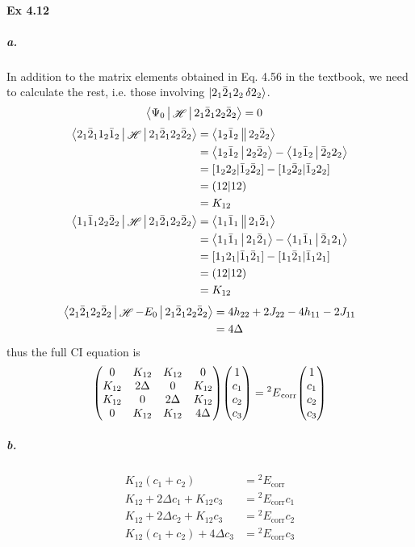 \documentclass[a4paper]{article}
\DeclareMathOperator{\sH}{\mathscr{H}}
\DeclareMathOperator{\corr}{\mathrm{corr}}
\newcommand{\ex}[1]{\paragraph{Ex #1}}
\newcommand{\subex}[1]{\subparagraph{#1}}
\numberwithin{equation}{subsection}
\begin{document}
\ex{4.12}
\subex{a.}
In addition to the matrix elements obtained in Eq. 4.56 in the textbook, we need to calculate the rest, i.e. those involving $ \ket{2_1\bar{2}_1 2_2\var{2}_2} $.
\begin{align}
\Braket{\Psi_0 | \sH | 2_1\bar{2}_1 2_2\bar{2}_2} &= 0 
\end{align}
\begin{align}
\Braket{2_1 \bar{2}_1 1_2\bar{1}_2 | \sH | 2_1\bar{2}_1 2_2\bar{2}_2} &= \Braket{1_2\bar{1}_2 || 2_2\bar{2}_2} \notag\\
&= \Braket{1_2\bar{1}_2 | 2_2\bar{2}_2} - \Braket{1_2\bar{1}_2 | \bar{2}_2 2_2} \notag\\
&= [1_2 2_2|\bar{1}_2 \bar{2}_2] - [1_2 \bar{2}_2 |\bar{1}_2 2_2] \notag\\
&= (12|12) \notag\\
&= K_{12} \\
\Braket{1_1 \bar{1}_1 2_2\bar{2}_2 | \sH | 2_1\bar{2}_1 2_2\bar{2}_2} &= \Braket{1_1 \bar{1}_1 || 2_1\bar{2}_1} \notag\\
&= \Braket{1_1 \bar{1}_1 | 2_1\bar{2}_1} - \Braket{1_1 \bar{1}_1 |\bar{2}_1 2_1} \notag\\
&= [1_1 2_1|\bar{1}_1 \bar{2}_1] - [1_1 \bar{2}_1 |\bar{1}_1 2_1] \notag\\
&= (12|12) \notag\\
&= K_{12}
\end{align}
\begin{align}
\Braket{2_1\bar{2}_1 2_2\bar{2}_2 | \sH - E_0 | 2_1\bar{2}_1 2_2\bar{2}_2} &= 4h_{22} + 2J_{22} - 4h_{11} - 2J_{11} \notag\\
&= 4\Delta
\end{align}
thus the full CI equation is
\begin{equation}\label{key}
\mqty(0 & K_{12} & K_{12} & 0\\
      K_{12} & 2\Delta & 0 & K_{12}\\
      K_{12} & 0 & 2\Delta & K_{12}\\
      0 & K_{12} & K_{12} & 4\Delta)
\mqty(1\\ c_1 \\ c_2 \\ c_3) = {^2 E}_{\corr} \mqty(1\\ c_1 \\ c_2 \\ c_3)
\end{equation}
\iffalse
\subex{b.}
\begin{align}
K_{12} (c_1 + c_2) &= {^2 E}_{\corr} \\
K_{12} + 2\Delta c_1 + K_{12}c_3 &= {^2 E}_{\corr}c_1 \label{b2}\\
K_{12} + 2\Delta c_2 + K_{12}c_3 &= {^2 E}_{\corr}c_2 \label{b3}\\
K_{12}(c_1 + c_2) + 4\Delta c_3 &= {^2 E}_{\corr}c_3 
\end{align}
\end{document}
